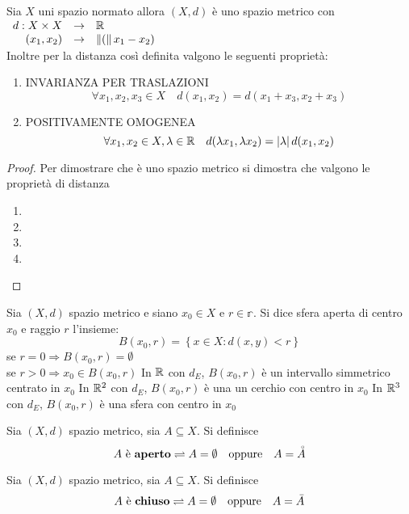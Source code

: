 \proposition
Sia $X$ uni spazio normato allora $(X,d)$ è uno spazio metrico con $\begin{array}{rcl} d : X\times X & \to & \mathbb{R} \\ (x_1,x_2) & \to & \left\|(\right\|x_1-x_2) \end{array}$\\
Inoltre per la distanza così definita valgono le seguenti proprietà:
\begin{enumerate}
	\item INVARIANZA PER TRASLAZIONI
	$$\forall x_1,x_2,x_3\in X \quad d(x_1,x_2)=d(x_1+x_3,x_2+x_3)$$
	\item POSITIVAMENTE OMOGENEA
	$$ \forall x_1,x_2\in X, \lambda\in\mathbb{R}\quad d(\lambda x_1,\lambda x_2)=\left|\lambda\right|d(x_1,x_2)$$
\end{enumerate}
\begin{proof}
	Per dimostrare che è uno spazio metrico si dimostra che valgono le proprietà di distanza
	\begin{enumerate}
		\item
		\item
		\item
		\item
	\end{enumerate}
\end{proof}

Sia $(X,d)$ spazio metrico e siano $x_0\in X$ e $r\in\mathbb{r}$. Si dice sfera aperta di centro $x_0$ e raggio $r$ l'insieme:
$$B(x_0,r)=\left\{ x\in X : d(x,y)<r  \right\}$$
\observation
se $r=0\Rightarrow B(x_0,r)=\emptyset$\\
se $r>0\Rightarrow x_0\in B(x_0,r)$
\example
In $\mathbb{R}$ con $d_E$, $B(x_0,r)$ è un intervallo simmetrico centrato in $x_0$
\example
In $\mathbb{R}^2$ con $d_E$, $B(x_0,r)$ è una un cerchio con centro in $x_0$
\example
In $\mathbb{R}^3$ con $d_E$, $B(x_0,r)$ è una sfera con centro in $x_0$
\example

\begin{definition}
	\label{def:aperto}
	Sia $(X,d)$ spazio metrico, sia $A\subseteq X$. Si definisce
	$$A\text{ è \textbf{aperto}}\rightleftharpoons A=\emptyset\quad\text{oppure}\quad A=\accentset{\circ}{A}$$
\end{definition}

\begin{definition}
	\label{def:chiuso}
	Sia $(X,d)$ spazio metrico, sia $A\subseteq X$. Si definisce
	$$A\text{ è \textbf{chiuso}}\rightleftharpoons A=\emptyset\quad\text{oppure}\quad A=\bar{A}$$
\end{definition}

